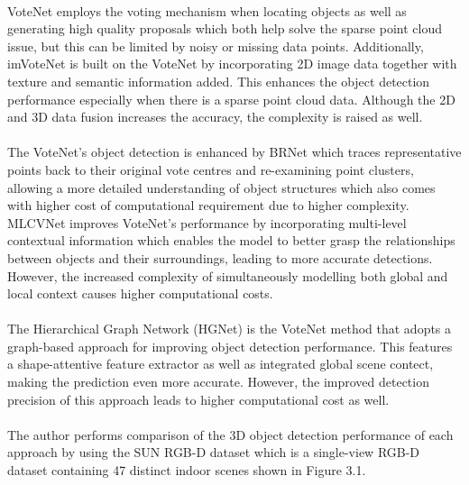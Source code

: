 \paragraph*{}
VoteNet employs the voting mechanism when locating objects as well as generating high quality proposals which both help solve the sparse point cloud issue, but this can be limited by noisy or missing data points. Additionally, imVoteNet is built on the VoteNet by incorporating 2D image data together with texture and semantic information added. This enhances the object detection performance especially when there is a sparse point cloud data. Although the 2D and 3D data fusion increases the accuracy, the complexity is raised as well.

\paragraph*{}
The VoteNet's object detection is enhanced by BRNet which traces representative points back to their original vote centres and re-examining point clusters, allowing a more detailed understanding of object structures which also comes with higher cost of computational requirement due to higher complexity. MLCVNet improves VoteNet's performance by incorporating multi-level contextual information which enables the model to better grasp the relationships between objects and their surroundings, leading to more accurate detections. However, the increased complexity of simultaneously modelling both global and local context causes higher computational costs. 

\paragraph*{}
The Hierarchical Graph Network (HGNet) is the VoteNet method that adopts a graph-based approach for improving object detection performance. This features a shape-attentive feature extractor as well as integrated global scene contect, making the prediction even more accurate. However, the improved detection precision of this approach leads to higher computational cost as well.

\paragraph*{}
The author performs comparison of the 3D object detection performance of each approach by using the SUN RGB-D dataset which is a single-view RGB-D dataset containing 47 distinct indoor scenes shown in Figure 3.1. 

